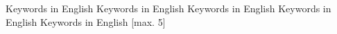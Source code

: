 Keywords in English   Keywords in English   Keywords in English   Keywords in English   Keywords in English   [max. 5]